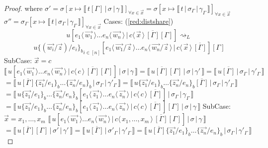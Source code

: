 \documentclass[a4paper,UKenglish,cleveref, autoref]{lipics-v2019}
\newcommand{\dist}[5]{#1 [ #2 \, \vert \, \fakedist{#4}{#5} \, #3 ]}
\newcommand{\fakedist}[2]{#1 \langle \, #2 \, \rangle}
\newcommand{\psub}[3]{#1 \{ #2 / #3 \}_{b}}
\newcommand{\readbackwmap}[3]{\llbracket \, #1 \, \vert \, #2 \, \vert \, #3  \, \rrbracket }
\begin{document}
\begin{proof}
\newline
where
\newline
$\sigma' = \sigma [x \mapsto \readbackwmap{t [\Gamma]}{\sigma}{\gamma}]_{\forall x \in \vec{x}} = \sigma[x \mapsto \readbackwmap{t}{\sigma_{\Gamma}}{\gamma_{\Gamma}}]_{\forall x \in \vec{x}}$
\newline
$\sigma'' =  \sigma_{\Gamma} [x \mapsto \readbackwmap{t}{\sigma_{\Gamma}}{\gamma_{\Gamma}}]_{\forall x \in \vec{x}}$
\newline
\newline
Cases: (\ref{red:distshare}) 
$$\dist{u}{\fakedist{e_{1}}{\vec{w_{1}}} \dots \fakedist{e_{n}}{\vec{w_{n}}}}{\overline{[\Gamma]} [\Gamma]}{c}{\vec{x}}  \rightsquigarrow_{L}$$ $$\dist{u {\psub{}{(\vec{w_{i}} / \vec{z})}{e_{i}}}_{i \in [n]}}{\fakedist{e_{1}}{\vec{w_{1}} / \vec{z}} \dots \fakedist{e_{n}}{\vec{w_{n}} / \vec{z}}}{\overline{[\Gamma]}}{c}{\vec{x}}[\Gamma] $$
\indent SubCase: $\vec{x} = c$
\newline
$\readbackwmap{\dist{u}{\fakedist{e_{1}}{\vec{w_{1}}} \dots \fakedist{e_{n}}{\vec{w_{n}}}}{\overline{[\Gamma]} [\Gamma]}{c}{c}}{\sigma}{\gamma} = \readbackwmap{u \overline{[\Gamma]} [\Gamma]}{\sigma}{\gamma'} = \readbackwmap{u \overline{[\Gamma]}}{\sigma_{\Gamma}}{\gamma'_{\Gamma}}$
\newline
$= \readbackwmap{u \overline{[\Gamma]} \psub{}{\vec{z_{1}}}{e_{1}} \dots \psub{}{\vec{z_{n}}}{e_{n}} }{\sigma_{\Gamma}}{\gamma'_{\Gamma}} =  \readbackwmap{u \psub{}{\vec{z_{1}}}{e_{1}} \dots \psub{}{\vec{z_{n}}}{e_{n}} \overline{[\Gamma]}}{\sigma_{\Gamma}}{\gamma'_{\Gamma}}$
\newline
$= \readbackwmap{ \dist{u \psub{}{\vec{z_{1}}}{e_{1}} \dots \psub{}{\vec{z_{n}}}{e_{n}} }{\fakedist{e_{1}}{\vec{z_{1}}} \dots \fakedist{e_{n}}{\vec{z_{n}}}}{\overline{[\Gamma]}}{c}{c}}{\sigma_{\Gamma}}{\gamma_{\Gamma}}$
\newline
$= \readbackwmap{ \dist{u \psub{}{\vec{z_{1}}}{e_{1}} \dots \psub{}{\vec{z_{n}}}{e_{n}} }{\fakedist{e_{1}}{\vec{z_{1}}} \dots \fakedist{e_{n}}{\vec{z_{n}}}}{\overline{[\Gamma]}}{c}{c} [\Gamma]}{\sigma}{\gamma}$
\newline
\newline
\indent SubCase: $\vec{x} = x_{1}, \dots, x_{m}$
\newline
$\readbackwmap{\dist{u}{\fakedist{e_{1}}{\vec{w_{1}}} \dots \fakedist{e_{n}}{\vec{w_{n}}}}{\overline{[\Gamma]} [\Gamma]}{c}{x_{1}, \dots, x_{m}}}{\sigma}{\gamma} $
\newline
$= \readbackwmap{u \overline{[\Gamma]} [\Gamma]}{\sigma'}{\gamma'} = \readbackwmap{u \overline{[\Gamma]}}{\sigma'_{\Gamma}}{\gamma'_{\Gamma}} = \readbackwmap{u \overline{[\Gamma]} \psub{}{\vec{z_{1}}}{e_{1}} \dots \psub{}{\vec{z_{n}}}{e_{n}} }{\sigma_{\Gamma}}{\gamma'_{\Gamma}}$

\end{proof}
\end{document}
